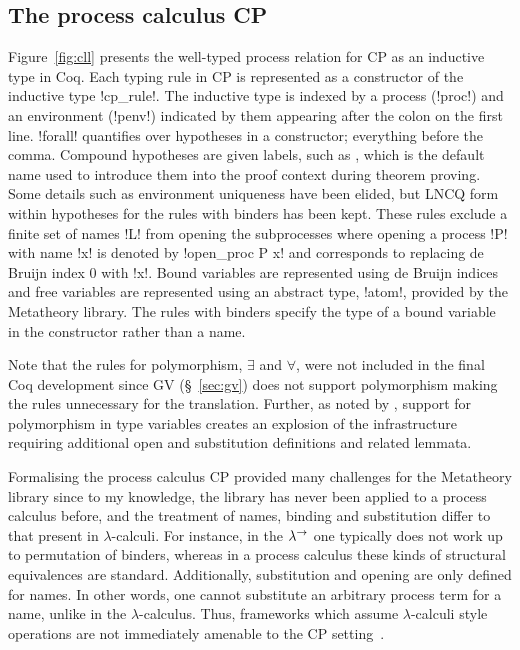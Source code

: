 \subsection{The process calculus CP}\label{sec:cp}




Figure~\ref{fig:cll} presents the well-typed process relation for CP as an
inductive type in Coq. Each typing rule in CP is represented as a constructor
of the inductive type \coqe!cp_rule!. The inductive type is indexed by a
process (\coqe!proc!) and an environment (\coqe!penv!) indicated by them
appearing after the colon on the first line. \coqe!forall! quantifies over
hypotheses in a constructor; everything before the comma. Compound hypotheses
are given labels, such as , which is the default name used to
introduce them into the proof context during theorem proving. Some details
such as environment uniqueness have been elided, but LNCQ form within
hypotheses for the rules with binders has been kept. These rules exclude a
finite set of names \coqe!L! from opening the subprocesses where opening a
process \coqe!P! with name \coqe!x! is denoted by \coqe!open_proc P x! and
corresponds to replacing de Bruijn index 0 with \coqe!x!. Bound variables are
represented using de Bruijn indices and free variables are represented using
an abstract type, \coqe!atom!, provided by the Metatheory library. The rules
with binders specify the type of a bound variable in the constructor rather
than a name.

Note that the rules for polymorphism, $\exists$ and $\forall$, were not
included in the final Coq development since GV (\S~\ref{sec:gv}) does not
support polymorphism making the rules unnecessary for the
translation. Further, as noted by \citeauthor{Lee:2012}, support for
polymorphism in type variables creates an explosion of the infrastructure
requiring additional open and substitution definitions and related lemmata.

Formalising the process calculus CP provided many challenges for the
Metatheory library since to my knowledge, the library has never been applied
to a process calculus before, and the treatment of names, binding and
substitution differ to that present in $\lambda$-calculi. For instance, in the
$\lambda^\rightarrow$ one typically does not work up to permutation of binders, whereas in a
process calculus these kinds of structural equivalences are
standard. Additionally, substitution and opening are only defined for
names. In other words, one cannot substitute an arbitrary process term for a
name, unlike in the $\lambda$-calculus. Thus, frameworks which assume
$\lambda$-calculi style operations are not immediately amenable to the CP
setting~\cite{Lee:2012}.

